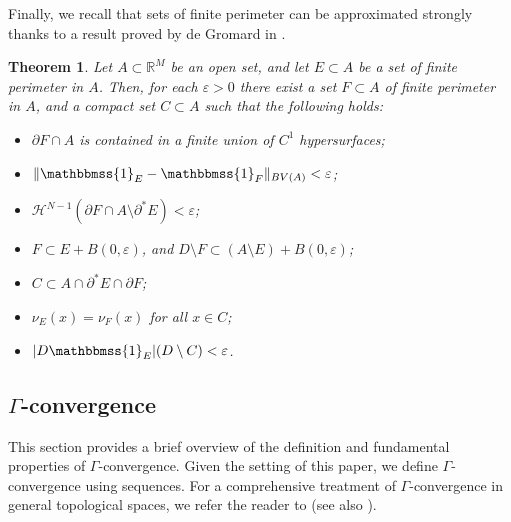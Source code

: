 \documentclass[a4paper, 11pt, reqno]{amsart}
\theoremstyle{plain}
\newtheorem{theorem}{Theorem}[section]
\theoremstyle{definition}
\theoremstyle{remark}
\newcommand{\R}{\mathbb R}
\newcommand{\ca}{\mathbb{1}}
\newcommand{\hno}{{\mathcal H}^{N-1}}
\def\ca{\mathbbmss{1}}
\begin{document}
Finally, we recall that sets of finite perimeter can be approximated strongly thanks to a result proved by de Gromard in \cite{DeGrom}.

\begin{theorem}\label{thm:strong_BV}
Let $A\subset \R^M$ be an open set, and let $E\subset A$ be a set of finite perimeter in $A$.
Then, for each $\varepsilon>0$ there exist a set $F\subset A$ of finite perimeter in $A$, and a compact set $C\subset A$ such that the following holds:
\begin{itemize}
\item[(i)] $\partial F\cap A$ is contained in a finite union of $C^1$ hypersurfaces;
\item[(ii)] $\| \ca_{E} - \ca_{F} \|_{BV(A)}<\varepsilon$;
\item[(iii)] $\hno(\partial F\cap A\setminus \partial^* E)<\varepsilon$;
\item[(iv)] $F\subset E+B(0,\varepsilon)$, and
    $D\setminus F\subset (A\setminus E)+B(0,\varepsilon)$;
\item[(v)] $C \subset A\cap \partial^* E \cap \partial F$;
\item[(vi)] $\nu_E(x) = \nu_F(x)$ for all $x\in C$;
\item[(vii)] $|D\ca_E|(D\setminus C)<\varepsilon$.
\end{itemize}
\end{theorem}






\subsection{$\Gamma$-convergence}

    This section provides a brief overview of the definition and fundamental properties of $\Gamma$-convergence. Given the setting of this paper, we define $\Gamma$-convergence using sequences. For a comprehensive treatment of $\Gamma$-convergence in general topological spaces, we refer the reader to \cite{Dalmasobook} (see also \cite{Braides}).
\end{document}
